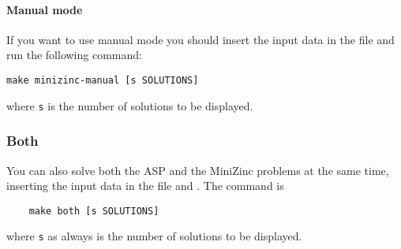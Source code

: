 \paragraph{Manual mode}

If you want to use manual mode you should insert the input data in the file  and run the following command:
\begin{verbatim}
make minizinc-manual [s SOLUTIONS]
\end{verbatim}
where \texttt{s} is the number of solutions to be displayed.

\subsubsection{Both}
You can also solve both the ASP and the MiniZinc problems at the same time, inserting the input data in the file  and . The command is
\begin{verbatim}
    make both [s SOLUTIONS]
\end{verbatim}
where \texttt{s} as always is the number of solutions to be displayed.